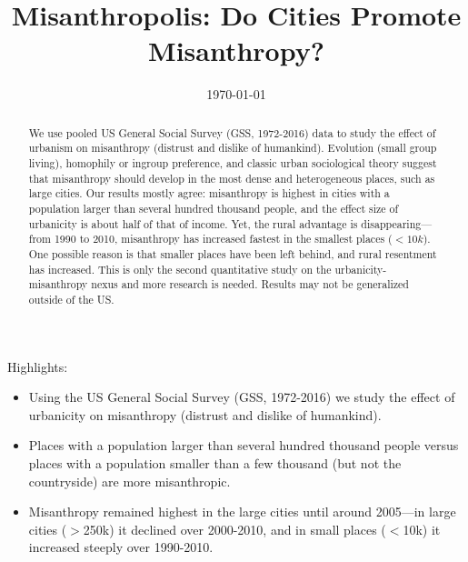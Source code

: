 \documentclass[11pt, letterpaper]{article}
\date{{}\today \hspace{.2in}\xxivtime}
\title{  %
\vspace{-.5in}  Misanthropolis: Do Cities Promote Misanthropy?
%
}
\author{
}
\begin{document}


\maketitle
\vspace{-.4in}
\begin{center}

\end{center}


Highlights:
\begin{itemize}
\item Using the US General Social Survey (GSS, 1972-2016) we study the effect of urbanicity on misanthropy (distrust and dislike of humankind).
\item  Places with a population larger than several hundred thousand people versus places with a population smaller than a few thousand (but not the countryside) are more misanthropic.
\item Misanthropy remained highest in the large cities until around 2005---in large cities ($>$250k) it declined over 2000-2010, and in small places ($<$10k) it increased steeply over 1990-2010.
\end{itemize}


\begin{abstract}
\noindent 
We use pooled US General Social Survey (GSS, 1972-2016) data to study the effect of urbanism on misanthropy (distrust and dislike of humankind). Evolution (small group living),  homophily or ingroup preference, and classic urban sociological theory  suggest that misanthropy should develop in the most dense and
heterogeneous places, such as large cities. Our results mostly agree: misanthropy is highest in cities with a population larger than several hundred thousand people, and the effect size of urbanicity is about half of that of
 income. Yet, the rural advantage is disappearing---from 1990 to  2010, misanthropy has increased fastest in the smallest places ($<10k$). One possible reason is that smaller places have been left behind, and rural resentment has increased. This is only the second quantitative study on the urbanicity-misanthropy nexus and more research is needed. Results may not be generalized outside of the US.

\end{abstract}
\end{document}
